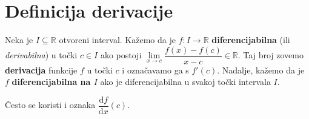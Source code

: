 \section{Definicija derivacije}
\begin{definition}
Neka je \(I\subseteq \mathbb{R}\) otvoreni interval. Kažemo da je \(f : I\to \mathbb{R}\) \textbf{diferencijabilna} (ili \textit{derivabilna}) u točki \(c\in I\) ako postoji \(\lim\limits_{x\to c}{\dfrac{f(x)-f(c)}{x-c}}\in \mathbb{R}\). Taj broj zovemo \textbf{derivacija} funkcije \(f\) u točki \(c\) i označavamo ga s \(f'(c)\). Nadalje, kažemo da je \(f\) \textbf{diferencijabilna na \(I\)} ako je diferencijabilna u svakoj točki intervala \(I\).
\end{definition}
Često se koristi i oznaka \(\dfrac{\mathrm{d}f}{\mathrm{d}x}(c)\).

